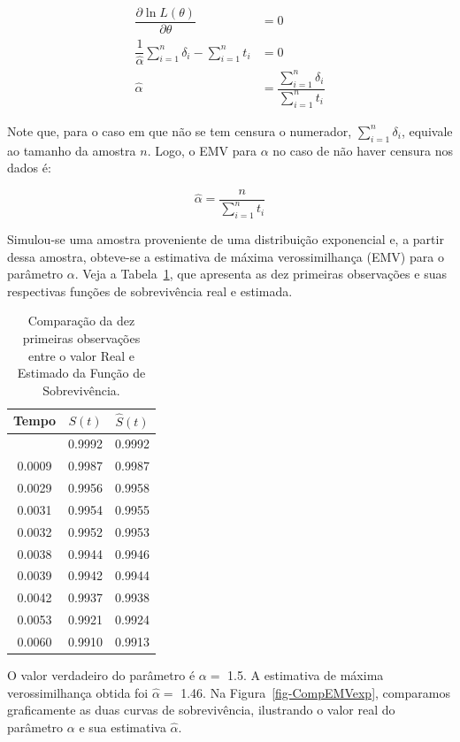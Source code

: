 \documentclass[
  12pt,
  letterpaper,
  DIV=11,
  numbers=noendperiod]{scrreprt}
\begin{document}
\begin{align*}
    \dfrac{\partial \ln L (\theta)}{\partial \theta}  & = 0 \\
    \dfrac{1}{\hat{\alpha}} \sum_{i = 1}^{n} \delta_{i} - \sum_{i = 1}^{n} t_{i} & = 0 \\
    \hat{\alpha} & = \dfrac{\sum_{i = 1}^{n} \delta_{i}}{\sum_{i = 1}^{n} t_{i}}
\end{align*}

Note que, para o caso em que não se tem censura o numerador,
\(\sum_{i = 1}^{n} \delta_{i}\), equivale ao tamanho da amostra \(n\).
Logo, o EMV para \(\alpha\) no caso de não haver censura nos dados é:

\[
\hat{\alpha} = \dfrac{n}{\sum_{i = 1}^{n} t_{i}}
\]

Simulou-se uma amostra proveniente de uma distribuição exponencial e, a
partir dessa amostra, obteve-se a estimativa de máxima verossimilhança
(EMV) para o parâmetro \(\alpha\). Veja a Tabela~\ref{tbl-EMVexpSt}, que
apresenta as dez primeiras observações e suas respectivas funções de
sobrevivência real e estimada.

\begin{longtable}[]{@{}ccc@{}}

\caption{\label{tbl-EMVexpSt}Comparação da dez primeiras observações
entre o valor Real e Estimado da Função de Sobrevivência.}

\tabularnewline

\toprule\noalign{}
Tempo & \(S(t)\) & \(\hat{S}(t)\) \\
\midrule\noalign{}
\endhead
\bottomrule\noalign{}
\endlastfoot
0.0006 & 0.9992 & 0.9992 \\
0.0009 & 0.9987 & 0.9987 \\
0.0029 & 0.9956 & 0.9958 \\
0.0031 & 0.9954 & 0.9955 \\
0.0032 & 0.9952 & 0.9953 \\
0.0038 & 0.9944 & 0.9946 \\
0.0039 & 0.9942 & 0.9944 \\
0.0042 & 0.9937 & 0.9938 \\
0.0053 & 0.9921 & 0.9924 \\
0.0060 & 0.9910 & 0.9913 \\

\end{longtable}

O valor verdadeiro do parâmetro é \(\alpha =\) 1.5. A estimativa de
máxima verossimilhança obtida foi \(\hat{\alpha} =\) 1.46. Na
Figura~\ref{fig-CompEMVexp}, comparamos graficamente as duas curvas de
sobrevivência, ilustrando o valor real do parâmetro \(\alpha\) e sua
estimativa \(\hat{\alpha}\).
\end{document}
